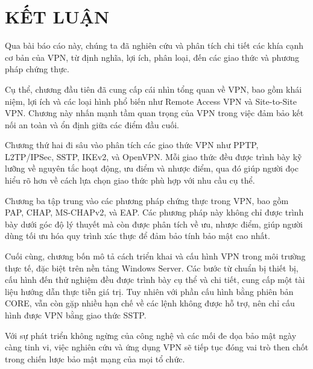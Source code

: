 \documentclass[13pt]{report}
\begin{document}
    \newpage

    

    \newpage
    

    \newpage
    

    \newpage
    
    
    \newpage
     \section*{\centering \fontsize{18pt}{20pt}\selectfont KẾT LUẬN}

    Qua bài báo cáo này, chúng ta đã nghiên cứu và phân tích chi tiết các khía cạnh cơ bản của VPN, từ định nghĩa, lợi ích, phân loại, đến các giao thức và phương pháp chứng thực.

    Cụ thể, chương đầu tiên đã cung cấp cái nhìn tổng quan về VPN, bao gồm khái niệm, lợi ích và các loại hình phổ biến như Remote Access VPN và Site-to-Site VPN. Chương này nhấn mạnh tầm quan trọng của VPN trong việc đảm bảo kết nối an toàn và ổn định giữa các điểm đầu cuối.

    Chương thứ hai đi sâu vào phân tích các giao thức VPN như PPTP, L2TP/IPSec, SSTP, IKEv2, và OpenVPN. Mỗi giao thức đều được trình bày kỹ lưỡng về nguyên tắc hoạt động, ưu điểm và nhược điểm, qua đó giúp người đọc hiểu rõ hơn về cách lựa chọn giao thức phù hợp với nhu cầu cụ thể.

    Chương ba tập trung vào các phương pháp chứng thực trong VPN, bao gồm PAP, CHAP, MS-CHAPv2, và EAP. Các phương pháp này không chỉ được trình bày dưới góc độ lý thuyết mà còn được phân tích về ưu, nhược điểm, giúp người dùng tối ưu hóa quy trình xác thực để đảm bảo tính bảo mật cao nhất.

    Cuối cùng, chương bốn mô tả cách triển khai và cấu hình VPN trong môi trường thực tế, đặc biệt trên nền tảng Windows Server. Các bước từ chuẩn bị thiết bị, cấu hình đến thử nghiệm đều được trình bày cụ thể và chi tiết, cung cấp một tài liệu hướng dẫn thực tiễn giá trị. Tuy nhiên với phần cấu hình bằng phiên bản CORE, vẫn còn gặp nhiều hạn chế về các lệnh không được hỗ trợ, nên chỉ cấu hình được VPN bằng giao thức SSTP. 

    Với sự phát triển không ngừng của công nghệ và các mối đe dọa bảo mật ngày càng tinh vi, việc nghiên cứu và ứng dụng VPN sẽ tiếp tục đóng vai trò then chốt trong chiến lược bảo mật mạng của mọi tổ chức. 
\newpage
     
\end{document}
